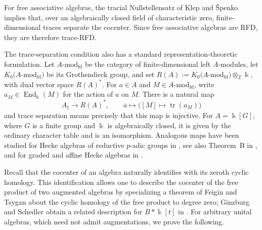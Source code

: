 For free associative algebras, the tracial Nullstellensatz of Klep and \v{S}penko \cite[Theorem~3.1]{KlepSpenko2014} implies that, over an algebraically closed field of characteristic zero, finite-dimensional traces separate the cocenter.
Since free associative algebras are RFD, they are therefore trace-RFD.

The trace-separation condition also has a standard representation-theoretic formulation.
Let \(A\text{-}\mathrm{mod}_{\mathrm{fd}}\) be the category of finite-dimensional left \(A\)-modules, let \(K_0\bigl(A\text{-}\mathrm{mod}_{\mathrm{fd}}\bigr)\) be its Grothendieck group, and set
\(
    R(A):=
    K_0\bigl(A\text{-}\mathrm{mod}_{\mathrm{fd}}\bigr)
    \otimes_{\mathbb{Z}}\Bbbk,
\)
with dual vector space \(R(A)^*\).
For \(a\in A\) and \(M\in A\text{-}\mathrm{mod}_{\mathrm{fd}}\), write \(a_M\in\operatorname{End}_{\Bbbk}(M)\) for the action of \(a\) on \(M\).
There is a natural map
\[
    A_{\natural}\longrightarrow R(A)^*,
    \qquad
    \overline{a}\longmapsto
    \bigl([M]\longmapsto\operatorname{tr}(a_M)\bigr)
\]
and trace separation means precisely that this map is injective.
For \(A=\Bbbk[G]\), where \(G\) is a finite group and \(\Bbbk\) is algebraically closed, it is given by the ordinary character table and is an isomorphism.
Analogous maps have been studied for Hecke algebras of reductive \(p\)-adic groups in \cite{Kazhdan1986Cuspidal,BernsteinDeligneKazhdan1986}, see also Theorem~B in \cite{Kazhdan1986CloseFields}, and for graded and affine Hecke algebras in \cite{CiubotaruHe2016,CiubotaruHe2017}.

Recall that the cocenter of an algebra naturally identifies with its zeroth cyclic homology.
This identification allows one to describe the cocenter of the free product of two augmented algebras by specializing a theorem of Feigin and Tsygan \cite[Theorem~3.2.1]{FeiginTsygan1987} about the cyclic homology of the free product to degree zero; Ginzburg and Schedler obtain a related description for \(B*\Bbbk[t]\) in \cite[Section~3.1]{GinzburgSchedler2012}.
For arbitrary unital algebras, which need not admit augmentations, we prove the following.

